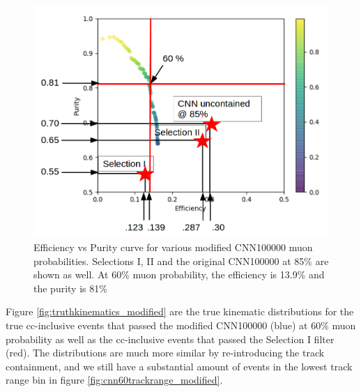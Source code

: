 \begin{figure}[htp!]
\centering
\includegraphics[width=.5\textwidth]{figs/roc.png}
\caption{Efficiency vs Purity curve for various modified CNN100000 muon probabilities. Selections I, II and the original CNN100000 at 85\% are shown as well. At 60\% muon probability, the efficiency is 13.9\% and the purity is 81\%} 
\label{fig:roc_modified}
\end{figure}

Figure \ref{fig:truthkinematics_modified} are the true kinematic distributions for the true cc-inclusive events that passed the modified CNN100000 (blue) at 60\% muon probability as well as the cc-inclusive events that passed the Selection I filter (red). The distributions are much more similar by re-introducing the track containment, and we still have a substantial amount of events in the lowest track range bin in figure \ref{fig:cnn60trackrange_modified}.  


